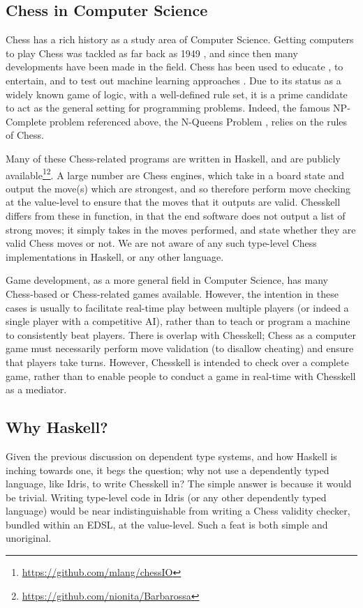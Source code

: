 \documentclass[12pt, a4paper, bibliography=totocnumbered]{scrreprt}
\begin{document}
\subsection{Chess in Computer Science}

Chess has a rich history as a study area of Computer Science. Getting computers to play Chess was tackled as far back as 1949 \cite{1949chess}, and since then many developments have been made in the field. Chess has been used to educate \cite{chesseducation}, to entertain, and to test out machine learning approaches \cite{chessml}. Due to its status as a widely known game of logic, with a well-defined rule set, it is a prime candidate to act as the general setting for programming problems. Indeed, the famous NP-Complete problem referenced above, the N-Queens Problem \cite{nqueensnp}, relies on the rules of Chess.

Many of these Chess-related programs are written in Haskell, and are publicly available\footnote{\url{https://github.com/mlang/chessIO}}\footnote{\url{https://github.com/nionita/Barbarossa}}. A large number are Chess engines, which take in a board state and output the move(s) which are strongest, and so therefore perform move checking at the value-level to ensure that the moves that it outputs are valid. Chesskell differs from these in function, in that the end software does not output a list of strong moves; it simply takes in the moves performed, and state whether they are valid Chess moves or not. We are not aware of any such type-level Chess implementations in Haskell, or any other language.

Game development, as a more general field in Computer Science, has many Chess-based or Chess-related games available. However, the intention in these cases is usually to facilitate real-time play between multiple players (or indeed a single player with a competitive AI), rather than to teach or program a machine to consistently beat players. There is overlap with Chesskell; Chess as a computer game must necessarily perform move validation (to disallow cheating) and ensure that players take turns. However, Chesskell is intended to check over a complete game, rather than to enable people to conduct a game in real-time with Chesskell as a mediator.

\subsection{Why Haskell?}

Given the previous discussion on dependent type systems, and how Haskell is inching towards one, it begs the question; why not use a dependently typed language, like Idris, to write Chesskell in? The simple answer is because it would be trivial. Writing type-level code in Idris (or any other dependently typed language) would be near indistinguishable from writing a Chess validity checker, bundled within an EDSL, at the value-level. Such a feat is both simple and unoriginal.
\end{document}
